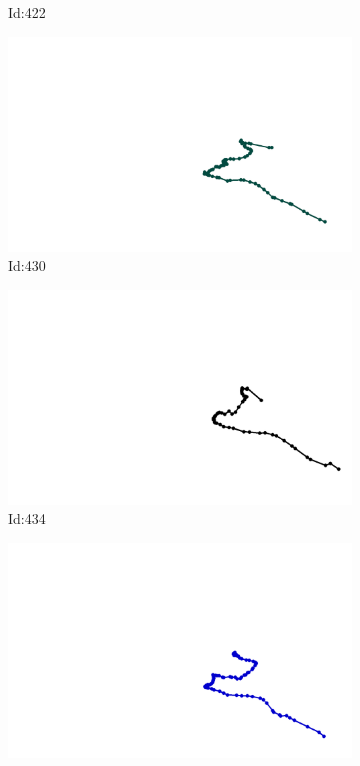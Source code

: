 \documentclass[12pt,twoside]{report}
\begin{document}
\begin{figure}
\begin{subfigure}[b]{0.20\textwidth}
\caption{Id:422}
\end{subfigure}
\begin{subfigure}[b]{0.20\textwidth}
\centering
\includegraphics[width=\textwidth]{../trajectories/430.png}
\caption{Id:430}
\end{subfigure}
\begin{subfigure}[b]{0.20\textwidth}
\centering
\includegraphics[width=\textwidth]{../trajectories/434.png}
\caption{Id:434}
\end{subfigure}
\begin{subfigure}[b]{0.20\textwidth}
\centering
\includegraphics[width=\textwidth]{../trajectories/445.png}

\end{subfigure}
\end{figure}
\end{document}
